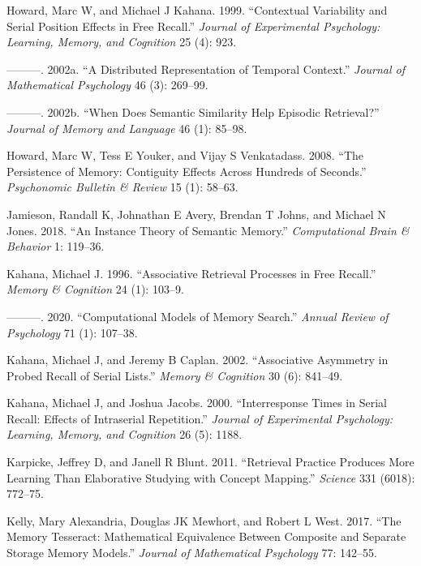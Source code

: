 \documentclass[
  letterpaper,
  11pt,
  english,
  singlespacing,
  headsepline]{MastersDoctoralThesis}
\newlength{\cslhangindent}
\newenvironment{CSLReferences}[2] %
 {\begin{list}{}{%
  \setlength{\itemindent}{0pt}
  \setlength{\leftmargin}{0pt}
  \setlength{\parsep}{0pt}
  \ifodd #1
   \setlength{\leftmargin}{\cslhangindent}
   \setlength{\itemindent}{-1\cslhangindent}
  \fi
  \setlength{\itemsep}{#2\baselineskip}}}
 {\end{list}}
\begin{document}
\begin{CSLReferences}{1}{0}
Howard, Marc W, and Michael J Kahana. 1999. {``Contextual Variability
and Serial Position Effects in Free Recall.''} \emph{Journal of
Experimental Psychology: Learning, Memory, and Cognition} 25 (4): 923.

---------. 2002a. {``A Distributed Representation of Temporal
Context.''} \emph{Journal of Mathematical Psychology} 46 (3): 269--99.

---------. 2002b. {``When Does Semantic Similarity Help Episodic
Retrieval?''} \emph{Journal of Memory and Language} 46 (1): 85--98.

Howard, Marc W, Tess E Youker, and Vijay S Venkatadass. 2008. {``The
Persistence of Memory: Contiguity Effects Across Hundreds of Seconds.''}
\emph{Psychonomic Bulletin \& Review} 15 (1): 58--63.

Jamieson, Randall K, Johnathan E Avery, Brendan T Johns, and Michael N
Jones. 2018. {``An Instance Theory of Semantic Memory.''}
\emph{Computational Brain \& Behavior} 1: 119--36.

Kahana, Michael J. 1996. {``Associative Retrieval Processes in Free
Recall.''} \emph{Memory \& Cognition} 24 (1): 103--9.

---------. 2020. {``Computational Models of Memory Search.''}
\emph{Annual Review of Psychology} 71 (1): 107--38.

Kahana, Michael J, and Jeremy B Caplan. 2002. {``Associative Asymmetry
in Probed Recall of Serial Lists.''} \emph{Memory \& Cognition} 30 (6):
841--49.

Kahana, Michael J, and Joshua Jacobs. 2000. {``Interresponse Times in
Serial Recall: Effects of Intraserial Repetition.''} \emph{Journal of
Experimental Psychology: Learning, Memory, and Cognition} 26 (5): 1188.

Karpicke, Jeffrey D, and Janell R Blunt. 2011. {``Retrieval Practice
Produces More Learning Than Elaborative Studying with Concept
Mapping.''} \emph{Science} 331 (6018): 772--75.

Kelly, Mary Alexandria, Douglas JK Mewhort, and Robert L West. 2017.
{``The Memory Tesseract: Mathematical Equivalence Between Composite and
Separate Storage Memory Models.''} \emph{Journal of Mathematical
Psychology} 77: 142--55.


\end{CSLReferences}
\end{document}
